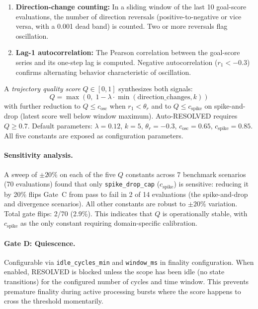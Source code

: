 \documentclass[11pt]{article}
\begin{document}
\begin{enumerate}
  \item \textbf{Direction-change counting:} In a sliding window of the last 10 goal-score evaluations, the number of direction reversals (positive-to-negative or vice versa, with a 0.001 dead band) is counted. Two or more reversals flag oscillation.
  \item \textbf{Lag-1 autocorrelation:} The Pearson correlation between the goal-score series and its one-step lag is computed. Negative autocorrelation ($r_1 < -0.3$) confirms alternating behavior characteristic of oscillation.
\end{enumerate}

A \emph{trajectory quality score} $Q \in [0, 1]$ synthesizes both signals:
\[
Q = \max\!\left(0,\; 1 - \lambda \cdot \min(\text{direction\_changes}, k)\right)
\]
with further reduction to $Q \leq c_{\text{osc}}$ when $r_1 < \theta_r$ and to $Q \leq c_{\text{spike}}$ on spike-and-drop (latest score well below window maximum). Auto-RESOLVED requires $Q \geq 0.7$. Default parameters: $\lambda = 0.12$, $k = 5$, $\theta_r = -0.3$, $c_{\text{osc}} = 0.65$, $c_{\text{spike}} = 0.85$. All five constants are exposed as configuration parameters.

\paragraph{Sensitivity analysis.} A sweep of $\pm 20\%$ on each of the five $Q$ constants across 7 benchmark scenarios (70 evaluations) found that only \texttt{spike\_drop\_cap} ($c_{\text{spike}}$) is sensitive: reducing it by 20\% flips Gate~C from pass to fail in 2 of 14 evaluations (the spike-and-drop and divergence scenarios). All other constants are robust to $\pm 20\%$ variation. Total gate flips: 2/70 (2.9\%). This indicates that $Q$ is operationally stable, with $c_{\text{spike}}$ as the only constant requiring domain-specific calibration.

\paragraph{Gate D: Quiescence.}
Configurable via \texttt{idle\_cycles\_min} and \texttt{window\_ms} in finality configuration. When enabled, RESOLVED is blocked unless the scope has been idle (no state transitions) for the configured number of cycles and time window. This prevents premature finality during active processing bursts where the score happens to cross the threshold momentarily.
\end{document}
